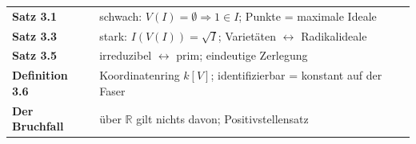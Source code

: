 \begin{merksatz}
\begin{center}
\renewcommand{\arraystretch}{1.5}
\begin{tabular}{@{}P{3.0cm}P{5.6cm}@{}}
\toprule
\textbf{Satz 3.1} & schwach: $V(I) = \emptyset\Rightarrow 1\in I$; Punkte = maximale Ideale\\
\textbf{Satz 3.3} & stark: $I(V(I)) = \sqrt I$; Varietäten $\leftrightarrow$ Radikalideale\\
\textbf{Satz 3.5} & irreduzibel $\leftrightarrow$ prim; eindeutige Zerlegung\\
\textbf{Definition 3.6} & Koordinatenring $k[V]$; identifizierbar = konstant auf der Faser\\
\textbf{Der Bruchfall} & über $\mathbb R$ gilt nichts davon; Positivstellensatz\\
\bottomrule
\end{tabular}
\end{center}

\begin{center}
\begin{minipage}{0.88\textwidth}
\end{minipage}
\end{center}
\end{merksatz}
